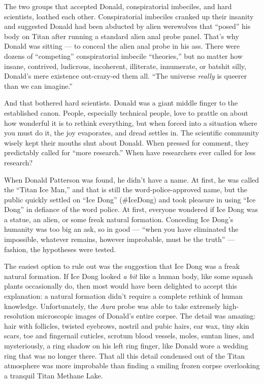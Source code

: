 The two groups that accepted Donald, conspiratorial imbeciles, and hard
scientists, loathed each other. Conspiratorial imbeciles cranked up
their insanity and suggested Donald had been abducted by alien
werewolves that ``posed'' his body on Titan after running a standard
alien anal probe panel. That's why Donald was sitting --- to conceal the
alien anal probe in his ass. There were dozens of ``competing''
conspiratorial imbecile ``theories,'' but no matter how insane,
contrived, ludicrous, incoherent, illiterate, innumerate, or batshit
silly, Donald's mere existence out-crazy-ed them all. ``The universe
\emph{really} is queerer than we can imagine.''

And that bothered hard scientists. Donald was a giant middle finger to
the established canon. People, especially technical people, love to
prattle on about how wonderful it is to rethink everything, but when
forced into a situation where you must do it, the joy evaporates, and
dread settles in. The scientific community wisely kept their mouths shut
about Donald. When pressed for comment, they predictably called for
``more research.'' When have researchers ever called for less research?

When Donald Patterson was found, he didn't have a name. At first, he was
called the ``Titan Ice Man,'' and that is still the word-police-approved
name, but the public quickly settled on ``Ice Dong'' (\#IceDong) and
took pleasure in using ``Ice Dong'' in defiance of the word police. At
first, everyone wondered if Ice Dong was a statue, an alien, or some
freak natural formation. Conceding Ice Dong's humanity was too big an
ask, so in good --- ``when you have eliminated the impossible, whatever
remains, however improbable, must be the truth'' --- fashion, the
hypotheses were tested.

The easiest option to rule out was the suggestion that Ice Dong was a
freak natural formation. If Ice Dong looked \emph{a bit} like a human
body, like some squash plants occasionally do, then most would have been
delighted to accept this explanation: a natural formation didn't require
a complete rethink of human knowledge. Unfortunately, the \emph{Aura}
probe was able to take extremely high-resolution microscopic images of
Donald's entire corpse. The detail was amazing: hair with follicles,
twisted eyebrows, nostril and pubic hairs, ear wax, tiny skin scars, toe
and fingernail cuticles, scrotum blood vessels, moles, suntan lines, and
mysteriously, a ring shadow on his left ring finger, like Donald wore a
wedding ring that was no longer there. That all this detail condensed
out of the Titan atmosphere was more improbable than finding a smiling
frozen corpse overlooking a tranquil Titan Methane Lake.

